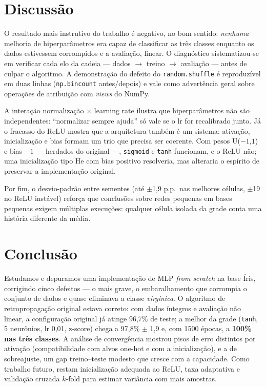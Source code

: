 \documentclass[conference]{IEEEtran}
\begin{document}
\section{Discussão}

O resultado mais instrutivo do trabalho é negativo, no bom sentido: \emph{nenhuma} melhoria de hiperparâmetros era capaz de classificar as três classes enquanto os dados estivessem corrompidos e a avaliação, linear. O diagnóstico sistematizou-se em verificar cada elo da cadeia --- dados $\to$ treino $\to$ avaliação --- antes de culpar o algoritmo. A demonstração do defeito do \texttt{random.shuffle} é reproduzível em duas linhas (\texttt{np.bincount} antes/depois) e vale como advertência geral sobre operações de atribuição com \emph{views} do NumPy.

A interação normalização $\times$ learning rate ilustra que hiperparâmetros não são independentes: ``normalizar sempre ajuda'' só vale se o lr for recalibrado junto. Já o fracasso do ReLU mostra que a arquitetura também é um sistema: ativação, inicialização e bias formam um trio que precisa ser coerente. Com pesos U($-1$,$1$) e bias $-1$ --- herdados do original ---, \texttt{sigmoid} e \texttt{tanh} funcionam, e o ReLU não; uma inicialização tipo He com bias positivo resolveria, mas alteraria o espírito de preservar a implementação original.

Por fim, o desvio-padrão entre sementes (até $\pm$1,9 p.p.\ nas melhores células, $\pm$19 no ReLU instável) reforça que conclusões sobre redes pequenas em bases pequenas exigem múltiplas execuções: qualquer célula isolada da grade conta uma história diferente da média.

\section{Conclusão}

Estudamos e depuramos uma implementação de MLP \emph{from scratch} na base Íris, corrigindo cinco defeitos --- o mais grave, o embaralhamento que corrompia o conjunto de dados e quase eliminava a classe \textit{virginica}. O algoritmo de retropropagação original estava correto: com dados íntegros e avaliação não linear, a configuração original já atinge 96,7\% de teste; a melhor da grade (\texttt{tanh}, 5 neurônios, lr 0,01, z-score) chega a 97,8\% $\pm$ 1,9 e, com 1500 épocas, a \textbf{100\% nas três classes}. A análise de convergência mostrou pisos de erro distintos por ativação (compatibilidade com alvos one-hot e com a inicialização), e a de sobreajuste, um gap treino--teste modesto que cresce com a capacidade. Como trabalho futuro, restam inicialização adequada ao ReLU, taxa adaptativa e validação cruzada $k$-fold para estimar variância com mais amostras.
\end{document}
